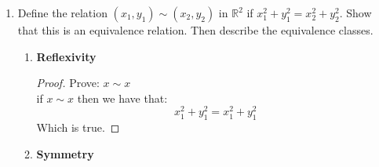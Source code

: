 \documentclass[11pt]{article}
\theoremstyle{definition}  %
\newcommand{\R}{\mathbb{R}}
\begin{document}
\begin{enumerate}
\begin{itemize}
\begin{enumerate}
\begin{proof}
      \end{proof}
      \item \textbf{Symmetry}
      \begin{proof}
        Prove $x \sim y \rightarrow y \sim x $\\
        if $x\sim y $ then :
        \[
          |x-y|\leq 4
        \]
        if $y\sim x$ then :
        \[
          |y-x|\leq 4
        \]
        For all x, y in the real numbers $|x-y|$ =$|y-x|$ therefore by this reason y is symmetric to x.
      \end{proof}
      \item \textbf{Transitivity}
      \begin{proof}
          Prove if $x\sim y$ and $y\sim z$ then $x \sim z $\\
          Consider the following hypothetical:
          given x,y,z $\in \R$ with x=4 y= 8, z= 12\\
          Then if $x \sim y$ this implies:
          \begin{align*}
            &|4-8|\leq 4 \\
            &4\leq 4
          \end{align*}
          \begin{align*}
            &|8-12|\leq ``4`` \\
            &4\leq 4
          \end{align*}
          \begin{align*}
            &|4-12|\leq 4 \\
            &8\leq 4
          \end{align*}
          so we have shown that the relation does not satisfy Transitivity.
      \end{proof}
    \end{enumerate}
    This relation is not an equivilance relation .
    \end{itemize}
\item Define the relation $(x_1, y_1) \sim (x_2,y_2)$ in $\R^2$ if $x_1^2 + y_1^2 = x_2^2 + y_2^2$. Show that this is an equivalence relation. Then describe the equivalence classes.
\begin{enumerate}
  \item \textbf{Reflexivity}
  \begin{proof}
    Prove: $x\sim x$\\
    if $x\sim x$ then we have that:
    \[
      x_1^2+y_1^2=x_1^2+y_1^2
    \]
    Which is true.
  \end{proof}
  \item \textbf{Symmetry}

\end{enumerate}
\end{enumerate}
\end{document}
